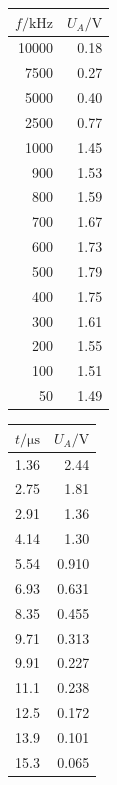\documentclass[]{scrartcl}
\begin{document}
\begin{table}[H]
	\centering
	\label{tab:differentiator}
	\hskip-1.50cm
	\begin{tabular}{r r}
		\toprule
		$f / \si{\kilo\hertz}$ & $U_A / \si{\volt}$ \\
		\midrule
		10000 & 0.18 \\
		7500  & 0.27 \\
		5000  & 0.40 \\
		2500  & 0.77 \\
		1000  & 1.45 \\
		900   & 1.53 \\
		800   & 1.59 \\
		700   & 1.67 \\
		600   & 1.73 \\
		500   & 1.79 \\
		400   & 1.75 \\
		300   & 1.61 \\
		200   & 1.55 \\
		100   & 1.51 \\
		50    & 1.49 \\
		\bottomrule
	\end{tabular}
\end{table}

\begin{table}[H]
	\centering
	\label{tab:peak}
	\hskip-1.50cm
	\begin{tabular}{r r}
		\toprule
		$t/\si{\micro\second}$ & $U_A / \si{\volt}$ \\
		\midrule
		1.36 & 2.44 \\
		2.75 & 1.81 \\
		2.91 & 1.36 \\
		4.14 & 1.30 \\
		5.54 & 0.910 \\
		6.93 & 0.631 \\
		8.35 & 0.455 \\
		9.71 & 0.313 \\
		9.91 & 0.227 \\
		11.1 & 0.238 \\
		12.5 & 0.172 \\
		13.9 & 0.101 \\
		15.3 & 0.065 \\
		\bottomrule
	\end{tabular}
\end{table}
\end{document}
